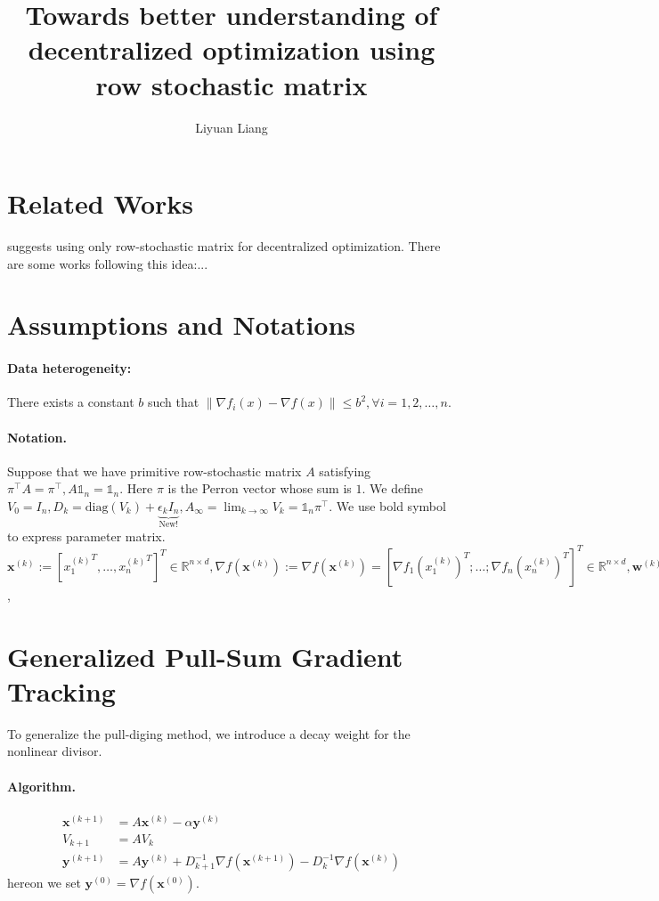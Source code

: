 \documentclass[10pt]{article}
\date{}
\title{Towards better understanding of decentralized optimization using row stochastic matrix}
\author{
Liyuan Liang
}
\newcommand{\vw}{{\mathbf{w}}}
\newcommand{\vx}{{\mathbf{x}}}
\newcommand{\vy}{{\mathbf{y}}}
\begin{document}
\maketitle
\section{Related Works}
\cite{xi2018linear,mai2016distributed} suggests using only row-stochastic matrix for decentralized optimization. There are some works following this idea:...
\section{Assumptions and Notations}

\paragraph{Data heterogeneity:}There exists a constant $b$ such that $\|\nabla f_i(x)-\nabla f(x)\|\le b^2,\forall i=1,2,\dots,n$.

\paragraph{Notation.}Suppose that we have primitive row-stochastic matrix $A$ satisfying $\pi^\top A=\pi^\top, A\mathds{1}_n=\mathds{1}_n$. Here $\pi$ is the Perron vector whose sum is $1$. We define $V_{0}=I_n,  D_{k}=\mathrm{diag}(V_k)+\underbrace{\epsilon_k I_n}_{\text{New!}}, A_\infty=\lim_{k\to\infty}V_k=\mathds{1}_n\pi^\top$. We use bold symbol to express parameter matrix. $\vx^{(k)}:=[{x_1^{(k)}}^T,\dots,{x_n^{(k)}}^T]^T\in\mathbb{R}^{n\times d},\nabla f(\vx^{(k)}) := \nabla f(\vx^{(k)})=[\nabla f_1(x_1^{(k)})^T;\dots;\nabla f_n(x_n^{(k)})^T]^T\in\mathbb{R}^{n\times d},\vw^{(k)}=A_\infty\vx^{(k)},w^{(k)}=\pi^T\vx^{(k)}$,
\section{Generalized Pull-Sum Gradient Tracking}

To generalize the pull-diging method, we introduce a decay weight for the nonlinear divisor. 

\paragraph{Algorithm.}
\begin{align}
    \vx^{(k+1)}&=A \vx^{(k)}-\alpha \vy^{(k)} \label{pull-sum-1}\\
    V_{k+1}&=AV_{k}\label{pull-sum-2}\\
    \vy^{(k+1)}&=A\vy^{(k)}+ D_{k+1}^{-1}\nabla f(\vx^{(k+1)})- D_{k}^{-1}\nabla f(\vx^{(k)})\label{pull-sum-3}
\end{align}
hereon we set $\vy^{(0)}=\nabla f(\vx^{(0)})$.
\end{document}
